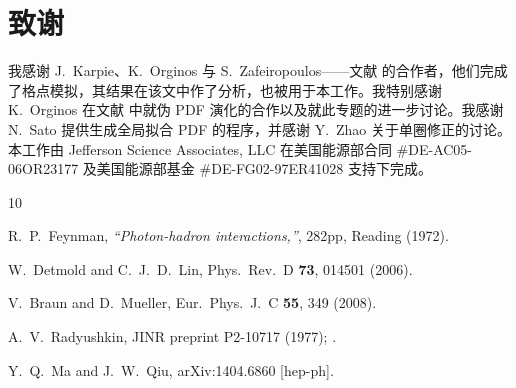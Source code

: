 \section*{致谢}

我感谢 J.~Karpie、K.~Orginos 与 S.~Zafeiropoulos——文献 \cite{Orginos:2017kos} 的合作者，他们完成了格点模拟，其结果在该文中作了分析，也被用于本工作。我特别感谢 K.~Orginos 在文献 \cite{Orginos:2017kos} 中就伪 PDF 演化的合作以及就此专题的进一步讨论。我感谢 N.~Sato 提供生成全局拟合 PDF 的程序，并感谢 Y.~Zhao 关于单圈修正的讨论。本工作由 Jefferson Science Associates, LLC 在美国能源部合同 \#DE-AC05-06OR23177 及美国能源部基金 \#DE-FG02-97ER41028 支持下完成。


\begin{thebibliography}{10}


  R.~P.~Feynman,
  {\it ``Photon-hadron interactions,''}, 282pp,
  Reading (1972).




  W.~Detmold and C.~J.~D.~Lin,
  Phys.\ Rev.\ D {\bf 73}, 014501 (2006).


  V.~Braun and D.~Mueller,
  Eur.\ Phys.\ J.\ C {\bf 55}, 349 (2008).



  A.~V.~Radyushkin,
JINR preprint P2-10717 (1977); \newline
  [hep-ph/0410276].

  Y.~Q.~Ma and J.~W.~Qiu,
  arXiv:1404.6860 [hep-ph].



\end{thebibliography}

